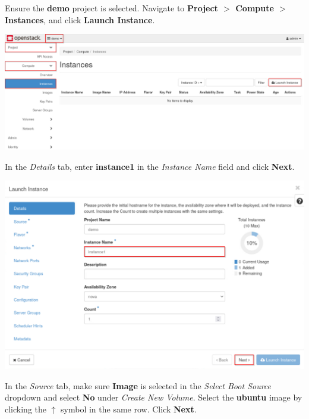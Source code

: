 \documentclass[letterpaper, 12pt]{article}
\begin{document}
\begin{enumerate}
    \begin{labstep}
        Ensure the \textbf{demo} project is selected.
        Navigate to \textbf{Project $>$ Compute $>$ Instances}, and click \textbf{Launch Instance}.

        \begin{center}
            \includegraphics[width=\linewidth]{images/part1/step4.png}
        \end{center}
    \end{labstep}

    \begin{labstep}
        In the \textit{Details} tab, enter \textbf{instance1} in the \textit{Instance Name} field and click \textbf{Next}.

        \begin{center}
            \includegraphics[width=\linewidth]{images/part1/step5.png}
        \end{center}
    \end{labstep}

    \begin{labstep}
        In the \textit{Source} tab, make sure \textbf{Image} is selected in the \textit{Select Boot Source} dropdown and select \textbf{No} under \textit{Create New Volume}.
        Select the \textbf{ubuntu} image by clicking the $\uparrow$ symbol in the same row.
        Click \textbf{Next}.


\end{labstep}
\end{enumerate}
\end{document}
